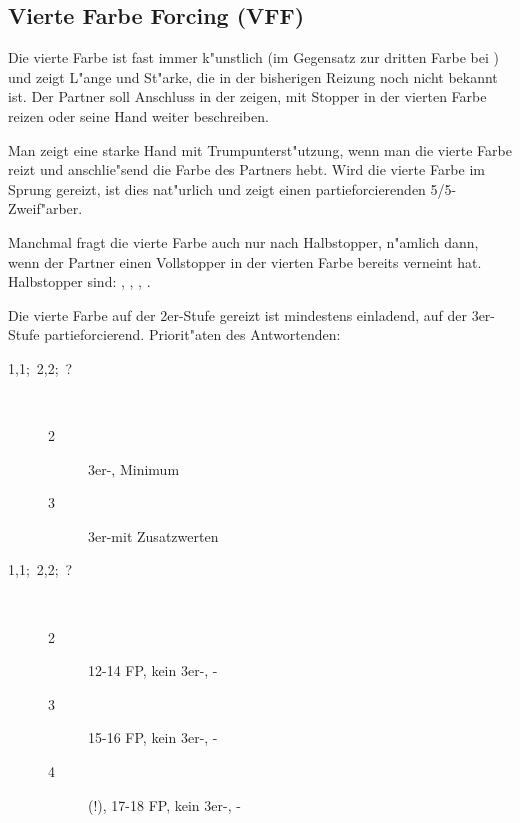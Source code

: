 \subsection{Vierte Farbe Forcing (VFF)} \label{vff}

Die vierte Farbe ist fast immer k"unstlich (im Gegensatz zur dritten Farbe bei
) und zeigt L"ange und St"arke, die in der bisherigen Reizung noch
nicht bekannt ist. Der Partner soll Anschluss in der \ofa zeigen, \sa mit
Stopper in der vierten Farbe reizen oder seine Hand weiter beschreiben.

Man zeigt eine starke Hand mit Trumpunterst"utzung, wenn man die vierte
Farbe reizt und anschlie"send die Farbe des Partners hebt. Wird die vierte
Farbe im Sprung gereizt, ist dies nat"urlich und zeigt einen partieforcierenden
5/5-Zweif"arber.

Manchmal fragt die vierte Farbe auch nur nach Halbstopper, n"amlich dann, wenn
der Partner einen Vollstopper in der vierten Farbe bereits verneint hat.
Halbstopper sind: , , , .

Die vierte Farbe auf der 2er-Stufe gereizt ist mindestens einladend, auf der
3er-Stufe partieforcierend.
Priorit"aten des Antwortenden:

\begin{description}
\item[1\coe{}\sep1\pik;~2\tre{}\sep2\kar;~?]~
  \begin{description}
    \item[2\pik] 3er-\pi, Minimum
    \item[3\pik] 3er-\pi mit Zusatzwerten
  \end{description}
\end{description}

\begin{description}
\item[1\coe{}\sep1\pik;~2\tre{}\sep2\kar;~?]~
  \begin{description}
    \item[2\SA] 12-14 FP, kein 3er-\pi, \ka-\stp
    \item[3\SA] 15-16 FP, kein 3er-\pi, \ka-\stp
    \item[4\SA] \nat{} (!), 17-18 FP, kein 3er-\pi, \ka-\stp
  \end{description}
\end{description}

